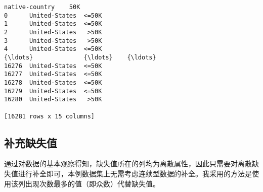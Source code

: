 \documentclass[11pt]{article}
\begin{document}
\begin{tcolorbox}[breakable, boxrule=.5pt, size=fbox, pad at break*=1mm, opacityfill=0]
\begin{Verbatim}[commandchars=\\\{\}]
      native-country    50K
0      United-States  <=50K
1      United-States  <=50K
2      United-States   >50K
3      United-States   >50K
4      United-States  <=50K
{\ldots}              {\ldots}    {\ldots}
16276  United-States  <=50K
16277  United-States  <=50K
16278  United-States  <=50K
16279  United-States  <=50K
16280  United-States   >50K

[16281 rows x 15 columns]
\end{Verbatim}
\end{tcolorbox}
        
    \hypertarget{ux8865ux5145ux7f3aux5931ux503c}{%
\subsection{补充缺失值}\label{ux8865ux5145ux7f3aux5931ux503c}}

通过对数据的基本观察得知，缺失值所在的列均为离散属性，因此只需要对离散缺失值进行补全即可，本例数据集上无需考虑连续型数据的补全。我采用的方法是使用该列出现次数最多的值（即众数）代替缺失值。
\end{document}
